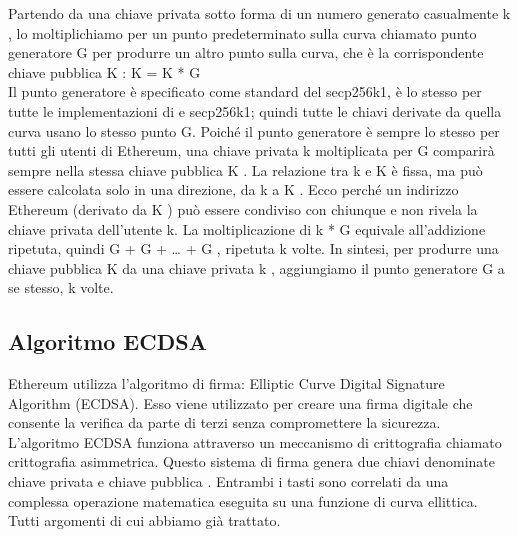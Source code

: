 \documentclass[a4paper,11pt]{report}
\begin{document}
Partendo da una chiave privata sotto forma di un numero generato casualmente k , lo moltiplichiamo per un punto predeterminato sulla curva chiamato punto generatore G per produrre un altro punto sulla curva, che è la corrispondente chiave pubblica K :
K = K * G\\
Il punto generatore è specificato come standard del secp256k1, è lo stesso per tutte le implementazioni di e secp256k1; quindi tutte le chiavi derivate da quella curva usano lo stesso punto G. Poiché il punto generatore è sempre lo stesso per tutti gli utenti di Ethereum, una chiave privata k moltiplicata per G comparirà sempre nella stessa chiave pubblica K . La relazione tra k e K è fissa, ma può essere calcolata solo in una direzione, da k a K . Ecco perché un indirizzo Ethereum (derivato da K ) può essere condiviso con chiunque e non rivela la chiave privata dell'utente k.
La moltiplicazione di k * G equivale all'addizione ripetuta, quindi G + G + … + G , ripetuta k volte. In sintesi, per produrre una chiave pubblica K da una chiave privata k , aggiungiamo il punto generatore G a se stesso, k volte.

\subsection{Algoritmo ECDSA}
Ethereum utilizza l'algoritmo di firma: Elliptic Curve Digital Signature Algorithm (ECDSA). Esso viene utilizzato per creare una firma digitale che consente la verifica da parte di terzi senza compromettere la sicurezza.\\
L'algoritmo ECDSA funziona attraverso un meccanismo di crittografia chiamato crittografia asimmetrica. Questo sistema di firma genera due chiavi denominate chiave privata e chiave pubblica . Entrambi i tasti sono correlati da una complessa operazione matematica eseguita su una funzione di curva ellittica. Tutti argomenti di cui abbiamo già trattato.\\
\end{document}
